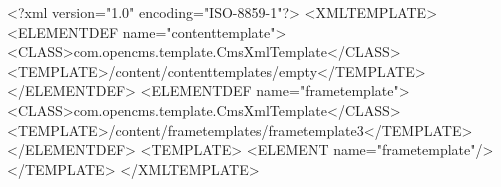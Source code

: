 <?xml version="1.0" encoding="ISO-8859-1"?> 
<XMLTEMPLATE>
    <ELEMENTDEF name="contenttemplate">
        <CLASS>com.opencms.template.CmsXmlTemplate</CLASS>
        <TEMPLATE>/content/contenttemplates/empty</TEMPLATE>
    </ELEMENTDEF>
    <ELEMENTDEF name="frametemplate">
        <CLASS>com.opencms.template.CmsXmlTemplate</CLASS>
        <TEMPLATE>/content/frametemplates/frametemplate3</TEMPLATE>
    </ELEMENTDEF>
<TEMPLATE> <ELEMENT name="frametemplate"/> </TEMPLATE>
</XMLTEMPLATE>
